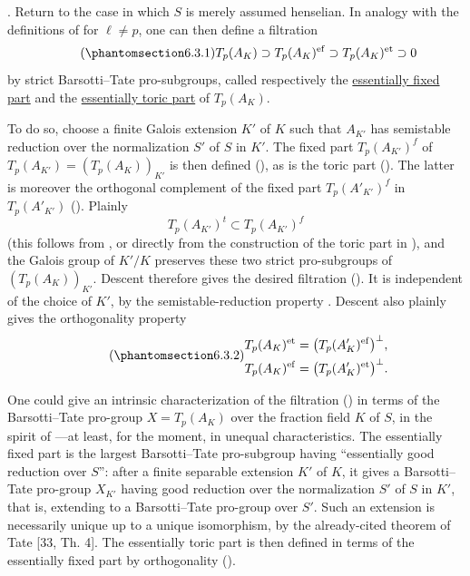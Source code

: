 \medskip
\noindent
{}. Return to the case in which $S$ is merely assumed henselian.  In
analogy with the definitions of  for $\ell\neq p$, one can then
define a filtration
\begin{equation}\tag{\SGARefTarget{sga7.sga7i.eix.n6-3-1}{6.3.1}}
 T_p(A_K)\supset T_p(A_K)^{\mathrm{ef}}
 \supset T_p(A_K)^{\mathrm{et}}\supset0
\end{equation}
by strict Barsotti--Tate pro-subgroups, called respectively the
\underline{essentially fixed part} and the
\underline{essentially toric part} of $T_p(A_K)$.

To do so, choose a finite Galois extension $K'$ of $K$ such that
$A_{K'}$ has semistable reduction over the normalization $S'$ of $S$
in $K'$.  The fixed part $T_p(A_{K'})^f$ of
$T_p(A_{K'})=(T_p(A_K))_{K'}$ is then defined (), as is the toric
part ().  The latter is moreover the orthogonal complement of the
fixed part $T_p(A'_{K'})^f$ in $T_p(A'_{K'})$ ().  Plainly
\[
 T_p(A_{K'})^t\subset T_p(A_{K'})^f
\]
(this follows from , or directly from the construction of the toric
part in ), and the Galois group of $K'/K$ preserves these two strict
pro-subgroups of $(T_p(A_K))_{K'}$.  Descent therefore gives the desired
filtration ().  It is independent of the choice of $K'$, by the
semistable-reduction property .  Descent also plainly gives the
orthogonality property
\begin{equation}\tag{\SGARefTarget{sga7.sga7i.eix.n6-3-2}{6.3.2}}
 \begin{split}
 T_p(A_K)^{\mathrm{et}}
   &=\bigl(T_p(A'_K)^{\mathrm{ef}}\bigr)^\perp,\\
 T_p(A_K)^{\mathrm{ef}}
   &=\bigl(T_p(A'_K)^{\mathrm{et}}\bigr)^\perp.
 \end{split}
\end{equation}

One could give an intrinsic characterization of the filtration ()
in terms of the Barsotti--Tate pro-group $X=T_p(A_K)$ over the fraction
field $K$ of $S$, in the spirit of ---at least, for the moment, in
unequal characteristics.  The essentially fixed part is the largest
Barsotti--Tate pro-subgroup having ``essentially good reduction over
$S$'': after a finite separable extension $K'$ of $K$, it gives a
Barsotti--Tate pro-group $X_{K'}$ having good reduction over the
normalization $S'$ of $S$ in $K'$, that is, extending to a
Barsotti--Tate pro-group over $S'$.  Such an extension is necessarily
unique up to a unique isomorphism, by the already-cited theorem of Tate
[33, Th. 4].  The essentially toric part is then defined in terms of
the essentially fixed part by orthogonality ().

